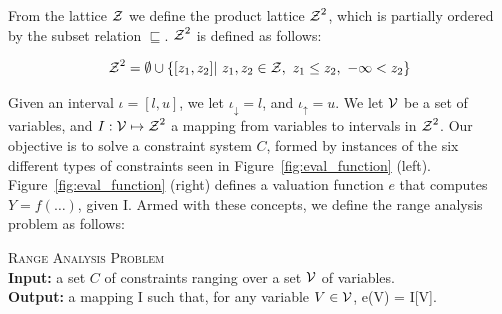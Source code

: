 \documentclass{llncs}
\newcommand{\lb}[1]{#1_{\downarrow}}
\newcommand{\ub}[1]{#1_{\uparrow}}
\newcommand{\varset}[1]{\mbox{$\cal{#1}$}}
\begin{document}
From the lattice $\varset{Z}$ we define the product lattice
$\varset{Z}^2$, which is partially ordered by the subset relation
$\sqsubseteq$.
$\varset{Z}^2$ is defined as follows:

\begin{equation*}
\varset{Z}^2 = \emptyset \cup \{[z_1, z_2] | \ z_1,z_2 \in \varset{Z},
\ z_1 \leq z_2, \  -\infty < z_2 \}
\end{equation*}

Given an interval $\iota = [l, u]$, we let $\lb{\iota} = l$, and
$\ub{\iota} = u$.
We let \varset{V} be a set of variables, and
$I: \varset{V} \mapsto \varset{Z}^2$ a
mapping from variables to intervals in $\varset{Z}^2$.
Our objective is to solve a constraint system $C$, formed by instances of the
six different types of constraints seen in Figure~\ref{fig:eval_function}
(left).
Figure~\ref{fig:eval_function} (right) defines a valuation function $e$ that
computes $Y = f(\ldots)$, given I.
Armed with these concepts, we define the range analysis problem as follows:

\begin{definition}
\label{def:rcp}
\textsc{Range Analysis Problem} \\
\textbf{Input:} a set $C$ of constraints ranging over a set \varset{V} of
variables. \\
\textbf{Output:} a mapping I such that, for any variable
$V \in \varset{V}$, e(V) = I[V].
\end{definition}
\end{document}
